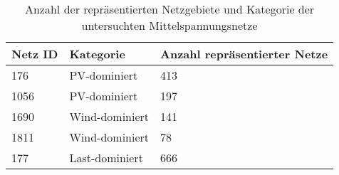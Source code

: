 {
\renewcommand{\arraystretch}{1.2}%
\begin{table}[H]
	\begin{center}
		\caption{Anzahl der repräsentierten Netzgebiete und Kategorie der untersuchten Mittelspannungsnetze}
		\begin{tabu} to 0.7\textwidth {X[0.6] X[1] X[1.5, r] }
			\toprule
			Netz ID    & Kategorie      & Anzahl repräsentierter Netze \\ \midrule
			\num{176}  & PV-dominiert   & \num{413}                    \\
			\num{1056} & PV-dominiert   & \num{197}                    \\
			\num{1690} & Wind-dominiert & \num{141}                    \\
			\num{1811} & Wind-dominiert & \num{78}                     \\
			\num{177}  & Last-dominiert & \num{666}                    \\ \bottomrule
		\end{tabu}
		\label{tab:grid_IDs}
	\end{center}
	\vspace{-3mm}%
\end{table}
}